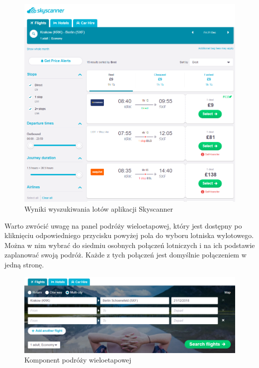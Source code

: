 \documentclass[12pt, twoside]{report}
\begin{document}
\begin{figure}[!ht]
\centering
\includegraphics[scale=0.45, keepaspectratio]{skyscanner_result.png}
\caption{Wyniki wyszukiwania lotów aplikacji Skyscanner}
\label{fig:skyscanner_result}
\end{figure}


Warto zwrócić uwagę na panel podróży wieloetapowej, który jest dostępny po kliknięciu  odpowiedniego przycisku powyżej pola do wyboru lotniska wylotowego. Można w nim wybrać do siedmiu osobnych połączeń lotniczych i na ich podstawie zaplanować swoją podróż. Każde z tych połączeń jest domyślnie połączeniem w jedną stronę. 
\begin{figure}[!ht]
\centering
\includegraphics[scale=0.50, keepaspectratio]{skyscanner_multi.png}
\caption{Komponent podróży wieloetapowej}
\label{fig:skyscanner_multi}
\end{figure}
\end{document}
